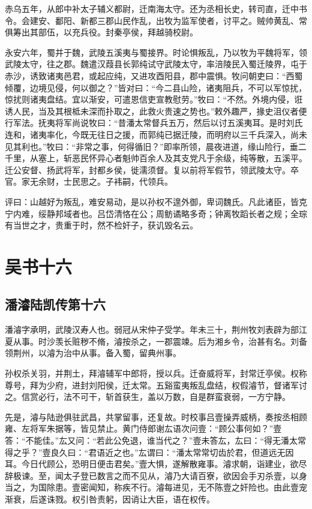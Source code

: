 \documentclass[12pt,UTF8]{ctexbook}
\begin{document}
赤乌五年，从郎中补太子辅义都尉，迁南海太守。还为丞相长史，转司直，迁中书令。会建安、鄱阳、新都三郡山民作乱，出牧为监军使者，讨平之。贼帅黄乱、常俱筹出其部伍，以充兵役。封秦亭侯，拜越骑校尉。

永安六年，蜀并于魏，武陵五溪夷与蜀接界。时论惧叛乱，乃以牧为平魏将军，领武陵太守，往之郡。魏遣汉葭县长郭纯试守武陵太守，率涪陵民入蜀迁陵界，屯于赤沙，诱致诸夷邑君，或起应纯，又进攻酉阳县，郡中震惧。牧问朝吏曰：“西蜀倾覆，边境见侵，何以御之？”皆对曰：“今二县山险，诸夷阻兵，不可以军惊扰，惊扰则诸夷盘结。宜以渐安，可遣恩信吏宣教慰劳。”牧曰：“不然。外境内侵，诳诱人民，当及其根柢未深而扑取之，此救火贵速之势也。”敕外趣严，掾史沮仪者便行军法。抚夷将军尚说牧曰：“昔潘太常督兵五万，然后以讨五溪夷耳。是时刘氏连和，诸夷率化，今既无往日之援，而郭纯已据迁陵，而明府以三千兵深入，尚未见其利也。”牧曰：“非常之事，何得循旧？”即率所领，晨夜进道，缘山险行，垂二千里，从塞上，斩恶民怀异心者魁帅百余人及其支党凡于余级，纯等散，五溪平。迁公安督、扬武将军，封都乡侯，徙濡须督。复以前将军假节，领武陵太守。卒官。家无余财，士民思之。子袆嗣，代领兵。

评曰：山越好为叛乱，难安易动，是以孙权不遑外御，卑词魏氏。凡此诸臣，皆克宁内难，绥静邦域者也。吕岱清恪在公；周鲂谲略多奇；钟离牧蹈长者之规；全琮有当世之才，贵重于时，然不检奸子，获讥毁名云。

\part{吴书十六}
\chapter{潘濬陆凯传第十六}

潘濬字承明，武陵汉寿人也。弱冠从宋仲子受学。年未三十，荆州牧刘表辟为部江夏从事。时沙羡长赃秽不脩，濬按杀之，一郡震竦。后为湘乡令，治甚有名。刘备领荆州，以濬为治中从事。备入蜀，留典州事。

孙权杀关羽，并荆土，拜濬辅军中郎将，授以兵。迁奋威将军，封常迁亭侯。权称尊号，拜为少府，进封刘阳侯，迁太常。五谿蛮夷叛乱盘结，权假濬节，督诸军讨之。信赏必行，法不可干，斩首获生，盖以万数，自是群蛮衰弱，一方宁静。

先是，濬与陆逊俱驻武昌，共掌留事，还复故。时校事吕壹操弄威柄，奏按丞相顾雍、左将军朱据等，皆见禁止。黄门侍郎谢厷语次问壹：“顾公事何如？”壹答：“不能佳。”厷又问：“若此公免退，谁当代之？”壹未答厷，厷曰：“得无潘太常得之乎？”壹良久曰：“君语近之也。”厷谓曰：“潘太常常切齿於君，但道远无因耳。今日代顾公，恐明日便击君矣。”壹大惧，遂解散雍事。濬求朝，诣建业，欲尽辞极谏。至，闻太子登已数言之而不见从，濬乃大请百寮，欲因会手刃杀壹，以身当之，为国除患。壹密闻知，称疾不行。濬每进见，无不陈壹之奸险也。由此壹宠渐衰，后遂诛戮。权引咎责躬，因诮让大臣，语在权传。
\end{document}
